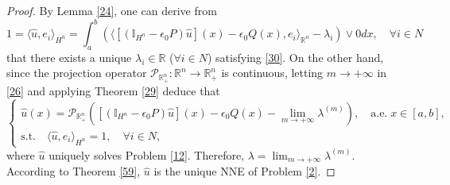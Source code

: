 \documentclass[10pt]{article}
\begin{document}
 \begin{proof}
 By Lemma \ref{24}, one can derive from
  $$
 1=\langle \widehat{u},e_i\rangle_{H^n}=\int_a^b(\langle[(\mathbb{I}_{H^n}-\epsilon_0P){\widehat{u}}](x)-\epsilon_0Q(x),e_i\rangle_{\mathbb{R}^n}-\lambda_i)\vee0dx,
 \quad \forall i\in N
 $$
 that there exists a unique $\lambda_i\in \mathbb{R}$ ($\forall i\in N$) satisfying \eqref{30}. On the other hand, since the projection operator $\mathcal{P}_{\mathbb{R}^n_+}:\mathbb{R}^n\rightarrow{\mathbb{R}^n_+}$ is continuous, letting $m\rightarrow+\infty$ in \eqref{26} and applying Theorem \ref{29} deduce that
   \begin{equation*}
   \begin{cases}
\widehat{u}(x)=\mathcal{P}_{\mathbb{R}^n_+}([(\mathbb{I}_{H^n}-\epsilon_0P){\widehat{u}}](x)-\epsilon_0Q(x)-\lim_{m\rightarrow+\infty}\lambda^{(m)}),\quad \mbox{a.e.} \;x\in[a,b],\\
\mbox{s.t.}\quad \langle \widehat{u},e_i\rangle_{H^n}=1,\quad\forall i\in N,
   \end{cases}
 \end{equation*}
where $\widehat{u}$ uniquely solves Problem \ref{12}. Therefore, $\lambda=\lim_{m\rightarrow+\infty}\lambda^{(m)}$. According to  Theorem \ref{59}, $\widehat{u}$ is   the unique NNE of Problem \ref{2}.
 \end{proof}
\end{document}
